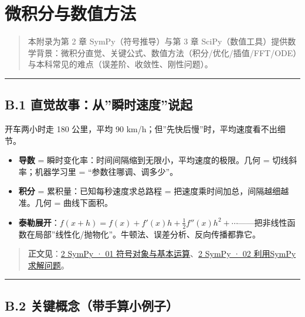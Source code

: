\chapter{微积分与数值方法}\label{ux5faeux79efux5206ux4e0eux6570ux503cux65b9ux6cd5}

\begin{quote}
本附录为第 2 章 SymPy（符号推导）与第 3 章
SciPy（数值工具）提供数学背景：微积分直觉、关键公式、数值方法（积分/优化/插值/FFT/ODE）与本科常见的难点（误差阶、收敛性、刚性问题）。
\end{quote}

\begin{center}\rule{0.5\linewidth}{0.5pt}\end{center}

\section{B.1
直觉故事：从''瞬时速度''说起}\label{b.1-ux76f4ux89c9ux6545ux4e8bux4eceux77acux65f6ux901fux5ea6ux8bf4ux8d77}

开车两小时走 180 公里，平均 90
km/h；但''先快后慢''时，平均速度看不出细节。

\begin{itemize}
\tightlist
\item
  \textbf{导数} = 瞬时变化率：时间间隔缩到无限小，平均速度的极限。几何 =
  切线斜率；机器学习里 = ``参数往哪调、调多少''。
\item
  \textbf{积分} = 累积量：已知每秒速度求总路程 =
  把速度乘时间加总，间隔越细越准。几何 = 曲线下面积。
\item
  \textbf{泰勒展开}：\(f(x+h)=f(x)+f'(x)h+\tfrac12 f''(x)h^2+\cdots\)------把非线性函数在局部''线性化/抛物化''。牛顿法、误差分析、反向传播都靠它。
\end{itemize}

\begin{quote}
\textbf{正文见}：\href{../../chapters/02-sympy/01-符号对象与基本运算.md}{2
SymPy · 01
符号对象与基本运算}、\href{../../chapters/02-sympy/02-利用SymPy求解问题.md}{2
SymPy · 02 利用SymPy求解问题}。
\end{quote}

\begin{center}\rule{0.5\linewidth}{0.5pt}\end{center}

\section{B.2
关键概念（带手算小例子）}\label{b.2-ux5173ux952eux6982ux5ff5ux5e26ux624bux7b97ux5c0fux4f8bux5b50}

